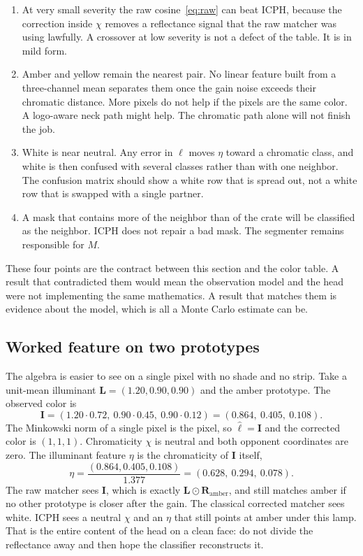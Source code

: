 \begin{enumerate}
\item At very small severity the raw cosine~\eqref{eq:raw} can beat ICPH, because the correction inside $\chi$ removes a reflectance signal that the raw matcher was using lawfully. A crossover at low severity is not a defect of the table. It is  in mild form.
\item Amber and yellow remain the nearest pair. No linear feature built from a three-channel mean separates them once the gain noise exceeds their chromatic distance. More pixels do not help if the pixels are the same color. A logo-aware neck path might help. The chromatic path alone will not finish the job.
\item White is near neutral. Any error in $\hat{\ell}$ moves $\eta$ toward a chromatic class, and white is then confused with several classes rather than with one neighbor. The confusion matrix should show a white row that is spread out, not a white row that is swapped with a single partner.
\item A mask that contains more of the neighbor than of the crate will be classified as the neighbor. ICPH does not repair a bad mask. The segmenter remains responsible for $M$.
\end{enumerate}

These four points are the contract between this section and the color table. A result that contradicted them would mean the observation model and the head were not implementing the same mathematics. A result that matches them is evidence about the model, which is all a Monte Carlo estimate can be.

\subsection{Worked feature on two prototypes}
\label{sec:icph-worked}

The algebra is easier to see on a single pixel with no shade and no strip. Take a unit-mean illuminant $\mathbf{L}=(1.20,0.90,0.90)$ and the amber prototype. The observed color is
\begin{equation}
\mathbf{I}
= (1.20\cdot 0.72,\ 0.90\cdot 0.45,\ 0.90\cdot 0.12)
= (0.864,\ 0.405,\ 0.108).
\label{eq:worked-i}
\end{equation}
The Minkowski norm of a single pixel is the pixel, so $\hat{\ell}=\mathbf{I}$ and the corrected color is $(1,1,1)$. Chromaticity $\chi$ is neutral and both opponent coordinates are zero. The illuminant feature $\eta$ is the chromaticity of $\mathbf{I}$ itself,
\begin{equation}
\eta
= \frac{(0.864,0.405,0.108)}{1.377}
= (0.628,\ 0.294,\ 0.078).
\label{eq:worked-eta}
\end{equation}
The raw matcher sees $\mathbf{I}$, which is exactly $\mathbf{L}\odot\mathbf{R}_{\text{amber}}$, and still matches amber if no other prototype is closer after the gain. The classical corrected matcher sees white. ICPH sees a neutral $\chi$ and an $\eta$ that still points at amber under this lamp. That is the entire content of the head on a clean face: do not divide the reflectance away and then hope the classifier reconstructs it.

